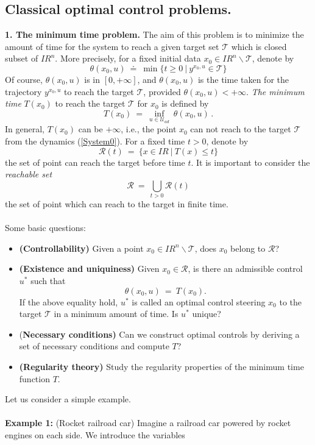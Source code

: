 \documentclass[letterpaper,12pt]{article}
\numberwithin{equation}{section}
\newcommand{\R}{\mathbb{R}}
\def\R{I\!\!R}
\def\bel{\begin{equation}\label}
\def\eeq{\end{equation}}
\begin{document}
\subsection{Classical optimal control problems.}
{\bf 1. The minimum time problem.} The aim of this problem is to minimize the amount of time for the system to reach a given target set $\mathcal{T}$ which is closed subset of $\R^n$. More precisely, for a fixed initial data $x_0\in\R^n\backslash\mathcal{T}$, denote by 
\[
\theta(x_0,u)~\doteq~\min\{t\geq 0~|~y^{x_0,u}\in\mathcal{T}\}
\]  
Of course, $\theta(x_0,u)$ is in $[0,+\infty]$, and $\theta(x_0,u)$ is the time taken for the trajectory $y^{x_0,u}$ to reach the target $\mathcal{T}$, provided $\theta(x_0,u)<+\infty$. {\it The minimum time} $T(x_0)$ to reach the target $\mathcal{T}$ for $x_0$ is defined by 
\bel{min-time}
T(x_0)~=~\inf_{u\in\mathcal{U}_{ad}}~\theta(x_0,u)\,.
\eeq
In general, $T(x_0)$ can be $+\infty$, i.e., the point $x_0$ can not reach to the target $\mathcal{T}$ from the dynamics (\ref{System0}). For a fixed time $t>0$, denote by 
\[
\mathcal{R}(t)~=~\{x\in\R~|~T(x)\leq t\}
\]
the set of point can reach the target before time $t$. It is important to consider the {\it reachable set} 
\[
\mathcal{R}~=~\bigcup_{t>0}\mathcal{R}(t)
\]
the set of point which can reach to the target in finite time.
\quad\\
\quad\\
Some basic questions:
\begin{itemize}
\item {\bf (Controllability)} Given a point $x_0\in\R^n\backslash\mathcal{T}$, does $x_0$ belong to $\mathcal{R}$?
\item {\bf (Existence and uniquiness)} Given $x_0\in\mathcal{R}$, is there an admissible control $u^*$ such that 
\[
\theta(x_0,u)~=~T(x_0).
\]
If the above equality hold, $u^*$ is called an optimal control steering $x_0$ to the target $\mathcal{T}$ in a minimum amount of time. Is $u^*$ unique?

\item {(\bf Necessary conditions)} Can we construct optimal controls by deriving a set of necessary conditions and compute $T$?
\item {\bf (Regularity theory)} Study the regularity properties of the minimum time function $T$.
\end{itemize}
Let us consider a simple example. 
\quad\\
\quad\\
\textbf{Example 1:} (Rocket railroad car) Imagine a railroad car powered by rocket engines on each side. We introduce the variables
\end{document}
